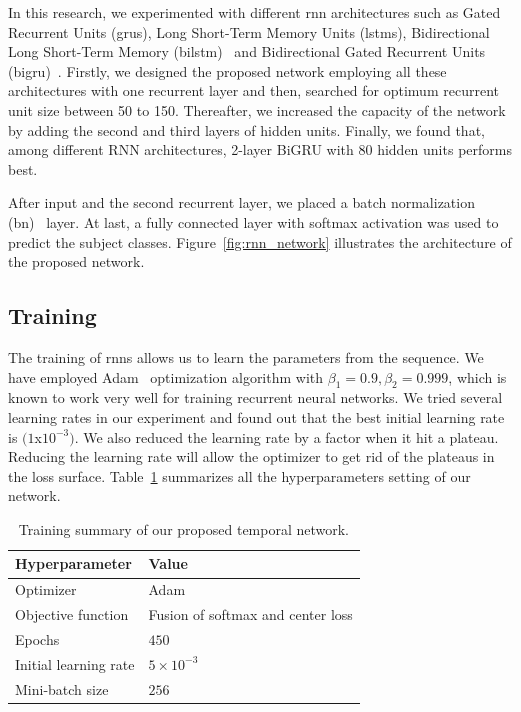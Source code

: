 In this research, we experimented with different \gls{rnn} architectures such as Gated Recurrent Units (\gls{gru}s),  Long Short-Term Memory Units (\gls{lstm}s), Bidirectional Long Short-Term Memory (\gls{bilstm})~\cite{Graves_05} and Bidirectional Gated Recurrent Units (\gls{bigru})~\cite{Schuster_97}. Firstly, we designed the proposed network employing all these architectures with one recurrent layer and then, searched for optimum recurrent unit size between 50 to 150. Thereafter, we increased the capacity of the network by adding the second and third layers of hidden units. Finally, we found that, among different RNN architectures, 2-layer BiGRU with 80 hidden units performs best. 

After input and the second recurrent layer, we placed a batch normalization (\gls{bn})~\cite{Ioffe_15} layer. At last, a fully connected layer with softmax activation was used to predict the subject classes. Figure~\ref{fig:rnn_network} illustrates the architecture of the proposed network. 


\subsection{Training}
The training of \gls{rnn}s allows us to learn the parameters from the sequence. We have employed Adam~\cite{Kingma_15} optimization algorithm with $\beta_1 = 0.9, \beta_2 = 0.999$, which is known to work very well for training recurrent neural networks. We tried several learning rates in our experiment and found out that the best initial learning rate is $(1$x$10^{-3})$. We also reduced the learning rate by a factor when it hit a plateau. Reducing the learning rate will allow the optimizer to get rid of the plateaus in the loss surface. Table~\ref{table:summary_tn} summarizes all the hyperparameters setting of our network.

\begin{table}
	\centering
	\caption{Training summary of our proposed temporal network. \label{table:summary_tn}}
	\begin{tabular*}{32pc}{@{\extracolsep{\fill}}ll@{}}
			\hline \noalign{\vspace{3pt}}
			\textbf{Hyperparameter} &\qquad \textbf{Value} \\ [3pt] \hline\noalign{\vspace{3pt}}
			Optimizer     			&\qquad Adam~\cite{Kingma_15} \\[3pt]
			Objective function  	&\qquad Fusion of softmax and center loss \\[3pt]
			Epochs        			&\qquad $ 450 $ \\ [3pt]
			Initial learning rate	&\qquad $5 \times 10^{-3}$  \\[3pt]
			Mini-batch size			&\qquad $ 256 $ \\
			\hline
	\end{tabular*}
\end{table}

